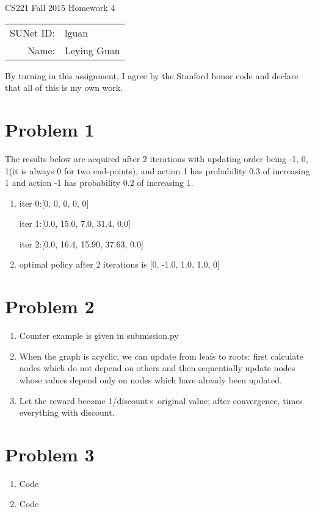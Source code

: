 \documentclass[12pt]{article}
\begin{document}
\begin{center}
{\Large CS221 Fall 2015 Homework 4}

\begin{tabular}{rl}
SUNet ID: & lguan \\
Name: & Leying Guan \\
\end{tabular}
\end{center}

By turning in this assignment, I agree by the Stanford honor code and declare
that all of this is my own work.

\section*{Problem 1}
The results below are acquired after 2 iterations with updating order being -1,
0, 1(it is always 0 for two end-points), and action 1 has probability 0.3 of
increasing 1 and action -1 has probability 0.2 of increasing 1.

\begin{enumerate}[label=(\alph*)]
\item iter 0:[0, 0, 0, 0, 0]

iter 1:[0.0, 15.0, 7.0, 31.4, 0.0]

iter 2:[0.0, 16.4, 15.90, 37.63, 0.0]

\item optimal policy after 2 iterations is [0, -1.0, 1.0, 1.0, 0]

\end{enumerate}
\section*{Problem 2}


\begin{enumerate}[label=(\alph*)]
  \item Counter example is given in submission.py
  \item When the graph is acyclic, we can update from leafs to roots: first
calculate nodes which do not depend on others and then sequentially update nodes
whose values depend only on nodes which have already been updated.
  \item Let the reward become 1/discount$\times$ original value; after
convergence, times everything with discount. 

\end{enumerate}

\section*{Problem 3}
\begin{enumerate}[label=(\alph*)]
\item Code
\item Code 
\end{enumerate}
\end{document}
